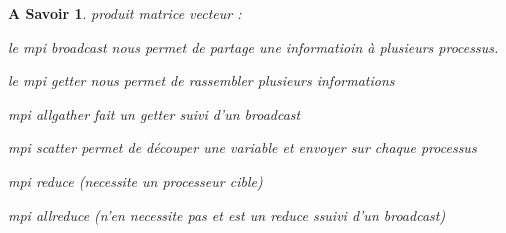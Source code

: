 \documentclass[a4paper,13pt]{book}
\newtheorem{know1}{A Savoir}[section]
\newenvironment{know}{\begin{know1}\color{blue_know}}{\end{know1}}
\begin{document}
\begin{know}
produit matrice vecteur : 

le mpi broadcast nous permet de partage une informatioin à plusieurs processus.

le mpi getter nous permet de rassembler plusieurs informations 

mpi allgather fait un getter suivi d'un broadcast

mpi scatter permet de découper une variable et envoyer sur chaque processus 

mpi reduce (necessite un processeur cible)

mpi allreduce (n'en necessite pas et est un reduce ssuivi d'un broadcast)
\end{know}
\end{document}
